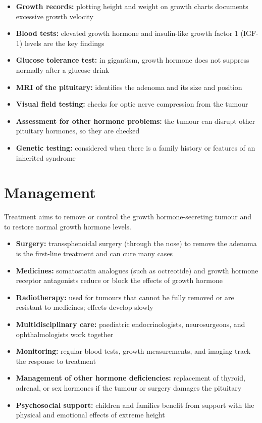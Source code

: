 \begin{itemize}
    \item \textbf{Growth records:} plotting height and weight on growth charts documents excessive growth velocity
    \item \textbf{Blood tests:} elevated growth hormone and insulin-like growth factor 1 (IGF-1) levels are the key findings
    \item \textbf{Glucose tolerance test:} in gigantism, growth hormone does not suppress normally after a glucose drink
    \item \textbf{MRI of the pituitary:} identifies the adenoma and its size and position
    \item \textbf{Visual field testing:} checks for optic nerve compression from the tumour
    \item \textbf{Assessment for other hormone problems:} the tumour can disrupt other pituitary hormones, so they are checked
    \item \textbf{Genetic testing:} considered when there is a family history or features of an inherited syndrome
\end{itemize}

\section*{Management}
Treatment aims to remove or control the growth hormone-secreting tumour and to restore normal growth hormone levels.

\begin{itemize}
    \item \textbf{Surgery:} transsphenoidal surgery (through the nose) to remove the adenoma is the first-line treatment and can cure many cases
    \item \textbf{Medicines:} somatostatin analogues (such as octreotide) and growth hormone receptor antagonists reduce or block the effects of growth hormone
    \item \textbf{Radiotherapy:} used for tumours that cannot be fully removed or are resistant to medicines; effects develop slowly
    \item \textbf{Multidisciplinary care:} paediatric endocrinologists, neurosurgeons, and ophthalmologists work together
    \item \textbf{Monitoring:} regular blood tests, growth measurements, and imaging track the response to treatment
    \item \textbf{Management of other hormone deficiencies:} replacement of thyroid, adrenal, or sex hormones if the tumour or surgery damages the pituitary
    \item \textbf{Psychosocial support:} children and families benefit from support with the physical and emotional effects of extreme height
\end{itemize}

